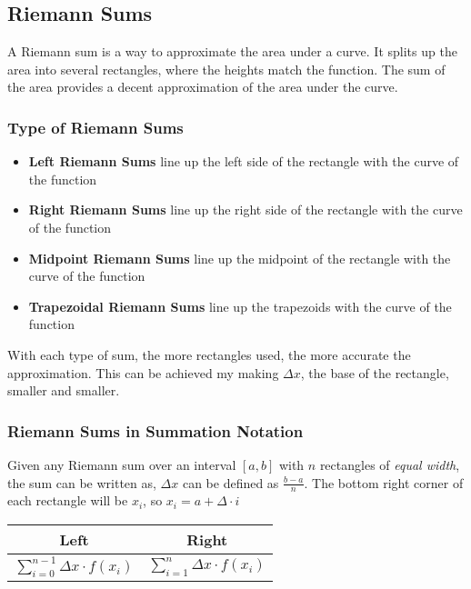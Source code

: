 \documentclass[12pt]{article}
\begin{document}
        \subsection{Riemann Sums}

        A Riemann sum is a way to approximate the area under a curve. It splits up the area into several
        rectangles, where the heights match the function. The sum of the area provides a decent
        approximation of the area under the curve.

        \subsubsection{Type of Riemann Sums}

        \begin{itemize}
            
            \item \textbf{Left Riemann Sums} line up the left side of the rectangle with the curve of the function
            \item \textbf{Right Riemann Sums} line up the right side of the rectangle with the curve of the function
            \item \textbf{Midpoint Riemann Sums} line up the midpoint of the rectangle with the curve of the function
            \item \textbf{Trapezoidal Riemann Sums} line up the trapezoids with the curve of the function

        \end{itemize}

        With each type of sum, the more rectangles used, the more accurate the approximation. This can be achieved my making 
        $\Delta x$, the base of the rectangle, smaller and smaller. 

        \subsubsection{Riemann Sums in Summation Notation}

        Given any Riemann sum over an interval $[a, b]$ with $n$ rectangles of \textit{equal width}, the sum can be written as,
        $\Delta x$ can be defined as $\frac{b - a}{n}$. The bottom right corner of each rectangle will be $x_i$, so $x_i = a + \Delta \cdot i$

            \begin{center}
                \begin{tabular}{ |  c  |  c  |}
                    \hline
                    Left & Right \\
                    \hline
                    $\sum_{i = 0}^{n - 1} \Delta x \cdot f(x_i)$ & $\sum_{i = 1}^{n} \Delta x \cdot f(x_i)$ \\
                    \hline
                \end{tabular}
            \end{center}
\end{document}
